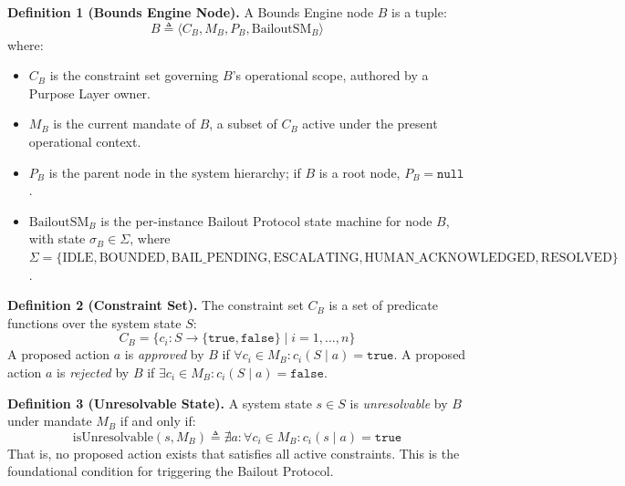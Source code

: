 \documentclass[12pt]{article}
\begin{document}
\noindent\textbf{Definition 1 (Bounds Engine Node).} A Bounds Engine node $B$ is a tuple:
\begin{equation}
B \triangleq \langle C_B, M_B, P_B, \text{BailoutSM}_B \rangle
\end{equation}
where:
\begin{itemize}\setlength\itemsep{0.25em}
\item $C_B$ is the constraint set governing $B$'s operational scope, authored by a Purpose Layer owner.
\item $M_B$ is the current mandate of $B$, a subset of $C_B$ active under the present operational context.
\item $P_B$ is the parent node in the system hierarchy; if $B$ is a root node, $P_B = \texttt{null}$.
\item $\text{BailoutSM}_B$ is the per-instance Bailout Protocol state machine for node $B$, with state $\sigma_B \in \Sigma$, where $\Sigma = \{\text{IDLE}, \text{BOUNDED}, \text{BAIL\_PENDING}, \text{ESCALATING}, \text{HUMAN\_ACKNOWLEDGED}, \text{RESOLVED}\}$.
\end{itemize}

\bigskip

\noindent\textbf{Definition 2 (Constraint Set).} The constraint set $C_B$ is a set of predicate functions over the system state $S$:
\begin{equation}
C_B = \{ c_i : S \rightarrow \{\texttt{true}, \texttt{false}\} \mid i = 1, \ldots, n \}
\end{equation}
A proposed action $a$ is \textit{approved} by $B$ if $\forall c_i \in M_B : c_i(S \mid a) = \texttt{true}$. A proposed action $a$ is \textit{rejected} by $B$ if $\exists c_i \in M_B : c_i(S \mid a) = \texttt{false}$.

\bigskip

\noindent\textbf{Definition 3 (Unresolvable State).} A system state $s \in S$ is \textit{unresolvable} by $B$ under mandate $M_B$ if and only if:
\begin{equation}
\text{isUnresolvable}(s, M_B) \triangleq \nexists a : \forall c_i \in M_B : c_i(s \mid a) = \texttt{true}
\end{equation}
That is, no proposed action exists that satisfies all active constraints. This is the foundational condition for triggering the Bailout Protocol.

\bigskip
\end{document}
